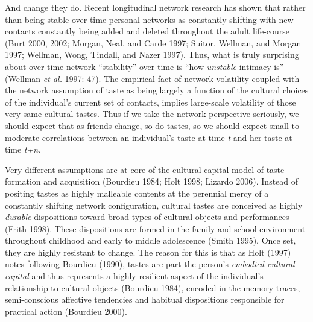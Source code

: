 And change they do. Recent longitudinal network research has shown that rather than being stable over time personal networks as constantly shifting with new contacts constantly being added and deleted throughout the adult life-course (Burt 2000, 2002; Morgan, Neal, and Carde 1997; Suitor, Wellman, and Morgan 1997; Wellman, Wong, Tindall, and Nazer 1997). Thus, what is truly surprising about over-time network ``stability'' over time is ``how \emph{unstable} intimacy is'' (Wellman \emph{et al.} 1997: 47). The empirical fact of network volatility coupled with the network assumption of taste as being largely a function of the cultural choices of the individual's current set of contacts, implies large-scale volatility of those very same cultural tastes. Thus if we take the network perspective seriously, we should expect that as friends change, so do tastes, so we should expect small to moderate correlations between an individual's taste at time \emph{t} and her taste at time \emph{t+n}.

Very different assumptions are at core of the cultural capital model of taste formation and acquisition (Bourdieu 1984; Holt 1998; Lizardo 2006). Instead of positing tastes as highly malleable contents at the perennial mercy of a constantly shifting network configuration, cultural tastes are conceived as highly \emph{durable} dispositions toward broad types of cultural objects and performances (Frith 1998). These dispositions are formed in the family and school environment throughout childhood and early to middle adolescence (Smith 1995). Once set, they are highly resistant to change. The reason for this is that as Holt (1997) notes following Bourdieu (1990), tastes are part the person's \emph{embodied cultural capital} and thus represents a highly resilient aspect of the individual's relationship to cultural objects (Bourdieu 1984), encoded in the memory traces, semi-conscious affective tendencies and habitual dispositions responsible for practical action (Bourdieu 2000).

